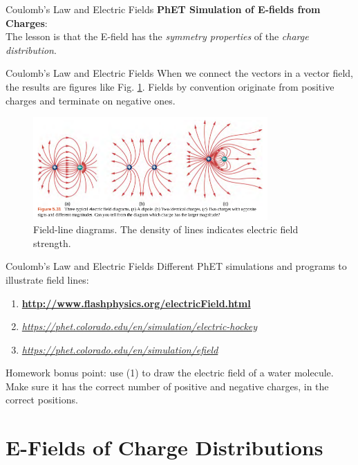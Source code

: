 \documentclass{beamer}
\begin{document}
\begin{frame}{Coulomb’s Law and Electric Fields}
\small
\textbf{PhET Simulation of E-fields from Charges}: \\ \vspace{0.5cm}
\alert{The lesson is that the E-field has the \textit{symmetry properties} of the \textit{charge distribution}}.
\end{frame}

\begin{frame}{Coulomb’s Law and Electric Fields}
When we connect the vectors in a vector field, the results are figures like Fig. \ref{fig:lines}.  Fields by convention originate from positive charges and terminate on negative ones.
\begin{figure}
\includegraphics[width=0.8\textwidth]{figures/lines.png}
\caption{\label{fig:lines} Field-line diagrams.  The density of lines indicates electric field strength.}
\end{figure}
\end{frame}

\begin{frame}{Coulomb’s Law and Electric Fields}
\small
Different PhET simulations and programs to illustrate field lines:
\begin{enumerate}
\item \textbf{\url{http://www.flashphysics.org/electricField.html}}
\item \textit{\url{https://phet.colorado.edu/en/simulation/electric-hockey}}
\item \textit{\url{https://phet.colorado.edu/en/simulation/efield}}
\end{enumerate}
Homework bonus point: use (1) to draw the electric field of a water molecule.  Make sure it has the correct number of positive and negative charges, in the correct positions.
\end{frame}

\section{E-Fields of Charge Distributions}
\end{document}
